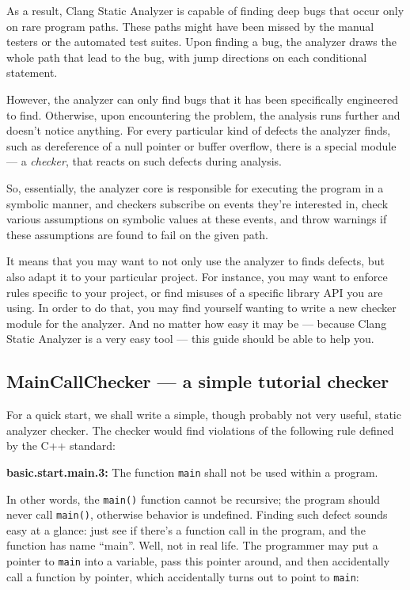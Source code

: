 \documentclass[a4paper,12pt]{article}
\newenvironment{nobr}{\begin{minipage}{\textwidth}\setlength\parskip{1em}
}{\end{minipage}\ignorespacesafterend}
\begin{document}
As a result, Clang Static Analyzer is capable of finding deep bugs that occur only on rare program paths. These paths might have been missed by the manual testers or the automated test suites. Upon finding a bug, the analyzer draws the whole path that lead to the bug, with jump directions on each conditional statement.

However, the analyzer can only find bugs that it has been specifically engineered to find. Otherwise, upon encountering the problem, the analysis runs further and doesn't notice anything. For every particular kind of defects the analyzer finds, such as dereference of a null pointer or buffer overflow, there is a special module --- a \emph{checker}, that reacts on such defects during analysis.

So, essentially, the analyzer core is responsible for executing the program in a symbolic manner, and checkers subscribe on events they're interested in, check various assumptions on symbolic values at these events, and throw warnings if these assumptions are found to fail on the given path.

It means that you may want to not only use the analyzer to finds defects, but also adapt it to your particular project. For instance, you may want to enforce rules specific to your project, or find misuses of a specific library API you are using. In order to do that, you may find yourself wanting to write a new checker module for the analyzer. And no matter how easy it may be --- because Clang Static Analyzer is a very easy tool --- this guide should be able to help you.

\begin{nobr}
\subsection{MainCallChecker --- a simple tutorial checker}

For a quick start, we shall write a simple, though probably not very useful, static analyzer checker. The checker would find violations of the following rule defined by the C++ standard:

\qquad\textbf{basic.start.main.3:} The function \lstinline|main| shall not be used within a program.
\end{nobr}

In other words, the \lstinline|main()| function cannot be recursive; the program should never call \lstinline|main()|, otherwise behavior is undefined. Finding such defect sounds easy at a glance: just see if there's a function call in the program, and the function has name ``main''. Well, not in real life. The programmer may put a pointer to \lstinline|main| into a variable, pass this pointer around, and then accidentally call a function by pointer, which accidentally turns out to point to \lstinline|main|:
\end{document}
